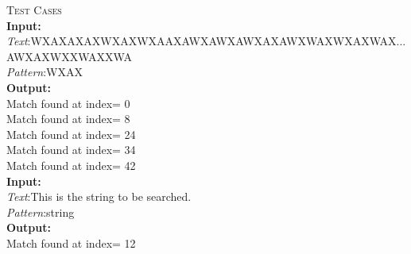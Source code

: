 \documentclass[12pt,a4paper]{article}%
\begin{document}
	\begin{flushleft}
	\textsc{Test Cases}\\
    \textbf{Input:}\\\textit{Text}:WXAXAXAXWXAXWXAAXAWXAWXAWXAXAWXWAXWXAXWAX...\\AWXAXWXXWAXXWA\\\textit{Pattern}:WXAX\\
    \textbf{Output:}\\Match found at index= 0\\                                                                                                        
    Match found at index= 8\\                                                                                                       
    Match found at index= 24\\                                                                                                      
    Match found at index= 34\\                                                                                                      
    Match found at index= 42\\\bigskip
    \textbf{Input:}\\\textit{Text}:This is the string to be searched.\\\textit{Pattern}:string\\
    \textbf{Output:}\\Match found at index= 12\\
    
	\end{flushleft}
	\pagebreak
\end{document}
